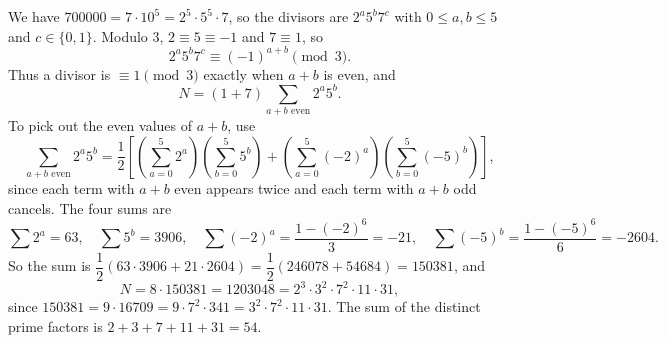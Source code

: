 We have $700000=7\cdot10^5=2^5\cdot5^5\cdot7$, so the divisors are $2^a5^b7^c$ with $0\le a,b\le5$ and $c\in\{0,1\}$. Modulo $3$, $2\equiv5\equiv-1$ and $7\equiv1$, so
\[2^a5^b7^c\equiv(-1)^{a+b}\pmod3.\]
Thus a divisor is $\equiv1\pmod3$ exactly when $a+b$ is even, and
\[N=(1+7)\sum_{a+b\text{ even}}2^a5^b.\]
To pick out the even values of $a+b$, use
\[\sum_{a+b\text{ even}}2^a5^b=\dfrac12\left[\left(\sum_{a=0}^5 2^a\right)\left(\sum_{b=0}^5 5^b\right)+\left(\sum_{a=0}^5(-2)^a\right)\left(\sum_{b=0}^5(-5)^b\right)\right],\]
since each term with $a+b$ even appears twice and each term with $a+b$ odd cancels. The four sums are
\[\sum 2^a=63,\quad\sum5^b=3906,\quad\sum(-2)^a=\dfrac{1-(-2)^6}{3}=-21,\quad\sum(-5)^b=\dfrac{1-(-5)^6}{6}=-2604.\]
So the sum is $\dfrac12(63\cdot3906+21\cdot2604)=\dfrac12(246078+54684)=150381$, and
\[N=8\cdot150381=1203048=2^3\cdot3^2\cdot7^2\cdot11\cdot31,\]
since $150381=9\cdot16709=9\cdot7^2\cdot341=3^2\cdot7^2\cdot11\cdot31$. The sum of the distinct prime factors is $2+3+7+11+31=\boxed{54}$.
